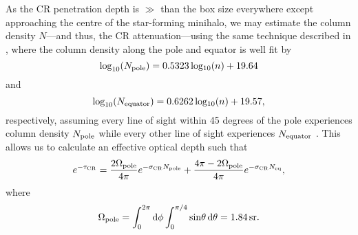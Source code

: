 As the CR penetration depth is $\gg$ than the box size everywhere except approaching the centre of the star-forming minihalo, we may estimate the column density $N$---and thus, the CR attenuation---using the same technique described in \citep{Hummeletal2015}, where the column density along the pole and equator is well fit by 
\begin{equation}
{\rm log}_{10}(N_{\rm \small pole}) = 0.5323\, {\rm log_{10}}(n) + 19.64
\end{equation}
and
\begin{equation}
{\rm log}_{10}(N_{\rm \small equator}) = 0.6262\, {\rm log_{10}}(n) + 19.57, 
\end{equation}
respectively, assuming every line of sight within 45 degrees of the pole experiences column density $N_{\rm \small pole}$ while every other line of sight experiences $N_{\rm \small equator}$ \citep{Hosokawaetal2011}. This allows us to calculate an effective optical depth such that
\begin{equation}
e^{-\tau_{\rm \small CR}} = \frac{2 \Omega_{\rm \small pole}}{4\pi} e^{-\sigma_{\rm \small CR} N_{\rm \small pole}} + \frac{4\pi - 2 \Omega_{\rm \small pole}}{4\pi} e^{-\sigma_{\rm \small CR} N_{\rm \small eq}},
\end{equation}
where
\begin{equation}
\Omega_{\rm \small pole} = \int_0^{2\pi}{\rm d}\phi \int_0^{\pi/4}{\rm sin}\theta \,{\rm d}\theta = 1.84\,{\rm sr}.
\end{equation}
  
  
  
  
  
  
  
  
  
  
  
  
